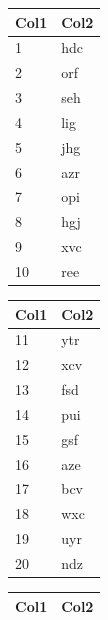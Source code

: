 \documentclass{ceri}
\begin{document}
\begin{table}[htb]
	\begin{minipage}[t]{0.19\linewidth}
		\centering
		\begin{tabular}{l l}
			\hline
			\rowcolor{DarkColor} 
			\textbf{Col1} 			& \textbf{Col2} \\ 
			\hline
			1 & hdc \\
			2 & orf \\
			3 & seh \\
			4 & lig \\
			5 & jhg \\
			6 & azr \\
			7 & opi \\
			8 & hgj \\
			9 & xvc \\
			10 & ree \\
			\hline
		\end{tabular}
	\end{minipage}
	\begin{minipage}[t]{0.19\linewidth}
		\centering
		\begin{tabular}{l l}
			\hline
			\rowcolor{DarkColor} 
			\textbf{Col1} 			& \textbf{Col2} \\ 
			\hline
			11 & ytr \\
			12 & xcv \\
			13 & fsd \\
			14 & pui \\
			15 & gsf \\
			16 & aze \\
			17 & bcv \\
			18 & wxc \\
			19 & uyr \\
			20 & ndz \\
			\hline
		\end{tabular}
	\end{minipage}
	\begin{minipage}[t]{0.19\linewidth}
		\centering
		\begin{tabular}{l l}
			\hline
			\rowcolor{DarkColor} 
			\textbf{Col1} 			& \textbf{Col2} \\ 
			\hline

\end{tabular}
\end{minipage}
\end{table}
\end{document}
